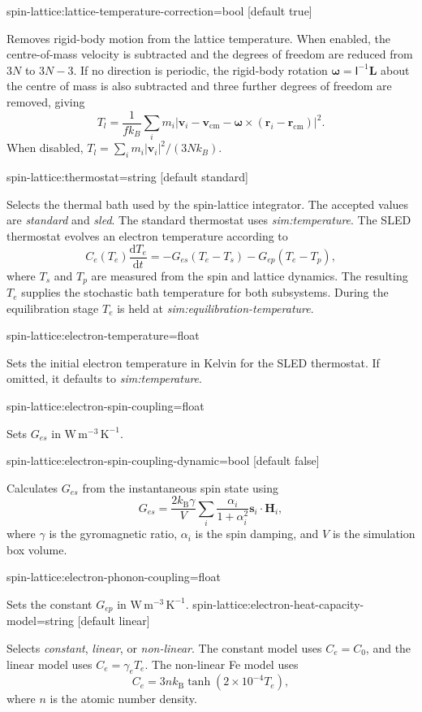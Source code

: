 {\zicf spin-lattice:lattice-temperature-correction=bool [default true]}
Removes rigid-body motion from the lattice temperature. When enabled, the centre-of-mass velocity is subtracted and the degrees of freedom are reduced from $3N$ to $3N-3$. If no direction is periodic, the rigid-body rotation $\boldsymbol{\omega}=\mathsf{I}^{-1}\mathbf{L}$ about the centre of mass is also subtracted and three further degrees of freedom are removed, giving
\[
T_l=\frac{1}{f k_B}\sum_i m_i\left|\mathbf{v}_i-\mathbf{v}_\mathrm{cm}-\boldsymbol{\omega}\times(\mathbf{r}_i-\mathbf{r}_\mathrm{cm})\right|^2 .
\]
When disabled, $T_l=\sum_i m_i|\mathbf{v}_i|^2/(3Nk_B)$.

{\zicf spin-lattice:thermostat=string [default standard]}
Selects the thermal bath used by the spin-lattice integrator. The accepted values are \textit{standard} and \textit{sled}. The standard thermostat uses
\textit{sim:temperature}. The SLED thermostat evolves an electron temperature according to
\[
C_e(T_e)\frac{\mathrm{d}T_e}{\mathrm{d}t}
=-G_{es}(T_e-T_s)-G_{ep}(T_e-T_p),
\]
where $T_s$ and $T_p$ are measured from the spin and lattice dynamics. The resulting $T_e$ supplies the stochastic bath temperature for both subsystems.
During the equilibration stage $T_e$ is held at \textit{sim:equilibration-temperature}.

{\zicf spin-lattice:electron-temperature=float}
Sets the initial electron temperature in Kelvin for the SLED thermostat. If omitted, it defaults to \textit{sim:temperature}.

{\zicf spin-lattice:electron-spin-coupling=float}
Sets $G_{es}$ in $\mathrm{W\,m^{-3}\,K^{-1}}$.

{\zicf spin-lattice:electron-spin-coupling-dynamic=bool [default false]}
Calculates $G_{es}$ from the instantaneous spin state using
\[
G_{es}=\frac{2k_{\mathrm B}\gamma}{V}
\sum_i\frac{\alpha_i}{1+\alpha_i^2}
\mathbf{s}_i\cdot\mathbf{H}_i,
\]
where $\gamma$ is the gyromagnetic ratio, $\alpha_i$ is the spin damping, and $V$ is the simulation box volume.

{\zicf spin-lattice:electron-phonon-coupling=float}
Sets the constant $G_{ep}$ in $\mathrm{W\,m^{-3}\,K^{-1}}$. 
{\zicf spin-lattice:electron-heat-capacity-model=string [default linear]}
Selects \textit{constant}, \textit{linear}, or \textit{non-linear}. The constant model uses $C_e=C_0$, and the linear model uses
$C_e=\gamma_eT_e$. The non-linear Fe model uses
\[
C_e=3n k_{\mathrm B}\tanh(2\times10^{-4}T_e),
\]
where $n$ is the atomic number density. 

